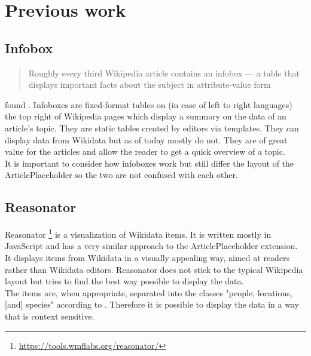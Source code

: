 \chapter{Previous work}
\section{Infobox} \label{infobox}
\begin{quote}
	Roughly every third Wikipedia article contains an infobox --- a table that displays important facts about the subject in attribute-value form
\end{quote}
found \citet[5]{infobox}. Infoboxes are fixed-format tables on (in case of left to right languages) the top right of Wikipedia pages which display a summary on the data of an article's topic. \citep{wiki:05} They are static tables created by editors via templates. They can display data from Wikidata but as of today mostly do not. They are of great value for the articles and allow the reader to get a quick overview of a topic. \\
It is important to consider how infoboxes work but still differ the layout of the ArticlePlaceholder so the two are not confused with each other.

\section{Reasonator}
Reasonator \footnote{\url{https://tools.wmflabs.org/reasonator/}} is a visualization of Wikidata items. It is written mostly in JavaScript and has a very similar approach to the ArticlePlaceholder extension. It displays items from Wikidata in a visually appealing way, aimed at readers rather than Wikidata editors. Reasonator does not stick to the typical Wikipedia layout but tries to find the best way possible to display the data. \\
The items are, when appropriate, separated into the classes  "people, locations, [and] species" according to \citet{wiki:06}. Therefore it is possible to display the data in a way that is context sensitive. \\

